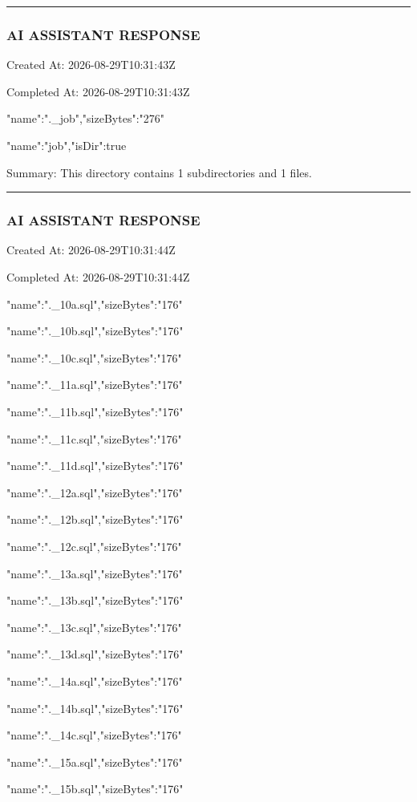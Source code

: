 \documentclass[11pt,a4paper]{article}
\begin{document}
\hrule

\subsubsection{AI ASSISTANT RESPONSE}

Created At: 2026-08-29T10:31:43Z

Completed At: 2026-08-29T10:31:43Z

{"name":".\_job","sizeBytes":"276"}

{"name":"job","isDir":true}


Summary: This directory contains 1 subdirectories and 1 files.


\hrule

\subsubsection{AI ASSISTANT RESPONSE}

Created At: 2026-08-29T10:31:44Z

Completed At: 2026-08-29T10:31:44Z

{"name":".\_10a.sql","sizeBytes":"176"}

{"name":".\_10b.sql","sizeBytes":"176"}

{"name":".\_10c.sql","sizeBytes":"176"}

{"name":".\_11a.sql","sizeBytes":"176"}

{"name":".\_11b.sql","sizeBytes":"176"}

{"name":".\_11c.sql","sizeBytes":"176"}

{"name":".\_11d.sql","sizeBytes":"176"}

{"name":".\_12a.sql","sizeBytes":"176"}

{"name":".\_12b.sql","sizeBytes":"176"}

{"name":".\_12c.sql","sizeBytes":"176"}

{"name":".\_13a.sql","sizeBytes":"176"}

{"name":".\_13b.sql","sizeBytes":"176"}

{"name":".\_13c.sql","sizeBytes":"176"}

{"name":".\_13d.sql","sizeBytes":"176"}

{"name":".\_14a.sql","sizeBytes":"176"}

{"name":".\_14b.sql","sizeBytes":"176"}

{"name":".\_14c.sql","sizeBytes":"176"}

{"name":".\_15a.sql","sizeBytes":"176"}

{"name":".\_15b.sql","sizeBytes":"176"}
\end{document}
